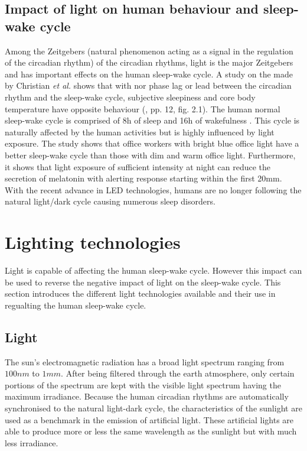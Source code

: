 \subsection{Impact of light on human behaviour and sleep-wake cycle}
Among the Zeitgebers (natural phenomenon acting as a signal in the regulation of the circadian rhythm)  of the circadian rhythms, light is the major Zeitgebers and has important effects on the human sleep-wake cycle. A study on the  made by Christian \textit{et al.}\cite{cir2014} shows that with nor phase lag or lead between the circadian rhythm and the sleep-wake cycle, subjective sleepiness and core body temperature have opposite behaviour (\cite{cir2014}, pp. 12, fig. 2.1). The human normal sleep-wake cycle is comprised of 8h of sleep and 16h of wakefulness \cite{is1995}. This cycle is naturally affected by the human activities but is highly influenced by light exposure. The study shows that office workers with bright blue office light have a better sleep-wake cycle than those with dim and warm office light. Furthermore, it shows that light exposure of sufficient intensity at night can reduce the secretion of melatonin with alerting response starting within the first 20mm. With the recent advance in LED technologies, humans are no longer following the natural light/dark cycle causing numerous sleep disorders. 

\section{Lighting technologies}

Light is capable of affecting the human sleep-wake cycle. However this impact can be used to reverse the negative impact of light on the sleep-wake cycle. This section introduces the different light technologies available and their use in regualting the human sleep-wake cycle. 

\subsection{Light}
The sun's electromagnetic radiation has a broad light spectrum ranging from  $100nm$ to $1mm$. After being filtered through the earth atmosphere, only certain portions of the spectrum are kept with the visible light spectrum having the maximum irradiance. Because the human circadian rhythms are automatically synchronised to the natural light-dark cycle, the characteristics of the sunlight are used as a benchmark in the emission of artificial light. These artificial lights are able to produce more or less the same wavelength as the sunlight but with much less irradiance.

